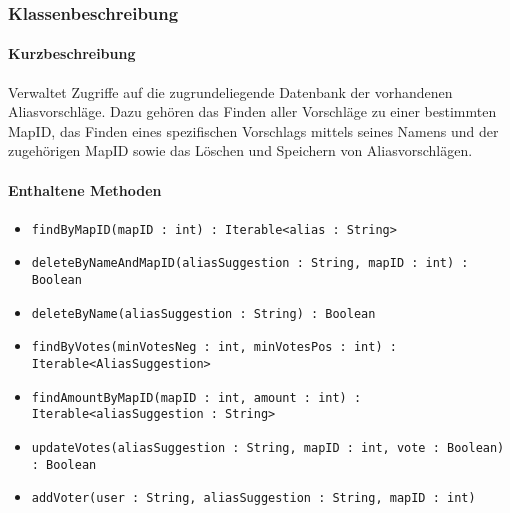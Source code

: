 \subsubsection*{Klassenbeschreibung}%
\paragraph*{Kurzbeschreibung}
Verwaltet Zugriffe auf die zugrundeliegende Datenbank der vorhandenen Aliasvorschläge.
Dazu gehören das Finden aller Vorschläge zu einer bestimmten MapID, das Finden eines spezifischen Vorschlags mittels 
seines Namens und der zugehörigen MapID sowie das Löschen und Speichern von Aliasvorschlägen.
\paragraph*{Enthaltene Methoden}
\begin{itemize}
    \item \texttt{findByMapID(mapID : int) : Iterable<alias : String>}
    \item \texttt{deleteByNameAndMapID(aliasSuggestion : String, mapID : int) : Boolean}
    \item \texttt{deleteByName(aliasSuggestion : String) : Boolean}
    \item \texttt{findByVotes(minVotesNeg : int, minVotesPos : int) : Iterable<AliasSuggestion>}
    \item \texttt{findAmountByMapID(mapID : int, amount : int) : Iterable<aliasSuggestion : String>}
    \item \texttt{updateVotes(aliasSuggestion : String, mapID : int, vote : Boolean) : Boolean}
    \item \texttt{addVoter(user : String, aliasSuggestion : String, mapID : int)}
\end{itemize}
